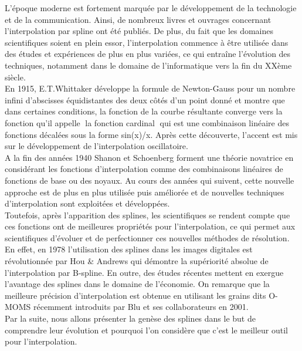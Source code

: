 \documentclass{article}
\begin{document}
\par   
	L'\'{e}poque moderne est fortement marqu\'{e}e par le d\'{e}veloppement de la technologie et de la communication. Ainsi, de nombreux livres et ouvrages concernant l'interpolation par spline ont \'{e}t\'{e} publi\'{e}s. De plus, du fait que les domaines scientifiques soient en plein essor, l'interpolation commence \`{a} \^{e}tre utilis\'{e}e dans des \'{e}tudes et exp\'{e}riences de plus en plus vari\'{e}es, ce qui entra\^{i}ne l'\'{e}volution des techniques, notamment dans le domaine de l'informatique vers la fin du XX\`{e}me si\`{e}cle.
\\
\indent
	En 1915, E.T.Whittaker d\'{e}veloppe la formule de Newton-Gauss pour un nombre infini d'abscisses \'{e}quidistantes des deux c\^{o}t\'{e}s d'un point donn\'{e} et montre que dans certaines conditions, la fonction de la courbe r\'{e}sultante converge vers la fonction qu'il appelle \guillemotleft $\;$la fonction cardinal\guillemotleft $\;$ qui est une combinaison lin\'{e}aire des fonctions d\'{e}cal\'{e}es sous la forme sin(x)/x. Apr\`{e}s cette d\'{e}couverte, l'accent est mis sur le d\'{e}veloppement de l'interpolation oscillatoire. 
\\
\indent
	A la fin des ann\'{e}es 1940 Shanon et Schoenberg forment une th\'{e}orie novatrice en consid\'{e}rant les fonctions d'interpolation comme des combinaisons lin\'{e}aires de fonctions de base ou des noyaux. Au cours des ann\'{e}es qui suivent, cette nouvelle approche est de plus en plus utilis\'{e}e puis am\'{e}lior\'{e}e et de nouvelles techniques d'interpolation sont exploit\'{e}es et d\'{e}velopp\'{e}es.
\\
\indent
	Toutefois, apr\`{e}s l'apparition des splines, les scientifiques se rendent compte que ces fonctions ont de meilleures propri\'{e}t\'{e}s pour l'interpolation, ce qui permet aux scientifiques d'\'{e}voluer et de perfectionner ces nouvelles m\'{e}thodes de r\'{e}solution.
\\
\indent
	En effet, en 1978 l'utilisation des splines dans les images digitales est r\'{e}volutionn\'{e}e par Hou \& Andrews qui d\'{e}montre la sup\'{e}riorit\'{e} absolue de l'interpolation par B-spline. En outre, des \'{e}tudes r\'{e}centes mettent en exergue l'avantage des splines dans le domaine de l'\'{e}conomie. On remarque que la meilleure pr\'{e}cision d'interpolation est obtenue en utilisant les grains dits O-MOMS r\'{e}cemment introduits par Blu et ses collaborateurs en 2001.
\\
\indent
	Par la suite, nous allons pr\'{e}senter la gen\`{e}se des splines dans le but de comprendre leur \'{e}volution et pourquoi l'on consid\`{e}re que c'est le meilleur outil pour l'interpolation.
\end{document}
